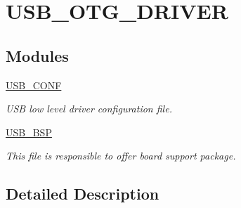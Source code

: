\hypertarget{group__USB__OTG__DRIVER}{\section{U\-S\-B\-\_\-\-O\-T\-G\-\_\-\-D\-R\-I\-V\-E\-R}
\label{group__USB__OTG__DRIVER}
}
\subsection*{Modules}
\begin{DoxyCompactItemize}
\item 
\hyperlink{group__USB__CONF}{U\-S\-B\-\_\-\-C\-O\-N\-F}
\begin{DoxyCompactList}\small\item\em U\-S\-B low level driver configuration file. \end{DoxyCompactList}\item 
\hyperlink{group__USB__BSP}{U\-S\-B\-\_\-\-B\-S\-P}
\begin{DoxyCompactList}\small\item\em This file is responsible to offer board support package. \end{DoxyCompactList}\end{DoxyCompactItemize}


\subsection{Detailed Description}
